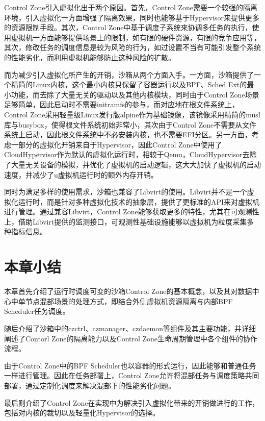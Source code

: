 Control Zone引入虚拟化出于两个原因。首先，Control Zone需要一个较强的隔离环境，引入虚拟化一方面增强了隔离效果，同时也能够基于Hypervisor来提供更多的资源限制手段。其次，Control Zone中基于调度子系统来协调多任务的执行，使用虚拟机一方面能够提供场景上的限制，如有限的硬件资源，有限的竞争应用等，其次，修改任务的调度信息是较为风险的行为，如过设置不当有可能引发整个系统的性能劣化，而利用虚拟机能够防止这种风险的扩散。

而为减少引入虚拟化所产生的开销，沙箱从两个方面入手。一方面，沙箱提供了一个精简的Linux内核，这个最小内核只保留了容器运行以及BPF、Sched Ext的最小功能，而去除了大量无关的驱动以及其他内核模块，同时由于Control Zone场景足够简单，因此启动时不需要initramfs的参与，而对应地在根文件系统上，Control Zone采用轻量级Linux发行版alpine作为基础镜像，该镜像采用精简的musl库与busybox，使得根文件系统初始非常小，其次由于Control Zone不需要从文件系统上启动，因此根文件系统中不必安装内核，也不需要EFI分区。另一方面，考虑一部分的虚拟化开销来自于Hypervisor，因此Control Zone中使用了CloudHypervisor作为默认的虚拟化运行时，相较于Qemu，CloudHypervisor去除了大量无关设备的模拟，并优化了虚拟机的启动逻辑，这大大加快了虚拟机的启动速度，并减少了u虚拟机运行时的额外内存开销。

同时为满足多样的使用需求，沙箱也兼容了Libvirt的使用。Libvirt并不是一个虚拟化运行时，而是针对多种虚拟化技术的抽象层，提供了更标准的API来对虚拟机进行管理。通过兼容Libvirt，Control Zone能够获取更多的特性，尤其在可观测性上，借助Libvirt提供的监测接口，可观测性基础设施能够以虚拟机为粒度采集多种指标信息。

\section{本章小结}

本章首先介绍了运行时调度可变的沙箱Control Zone的基本概念，以及其对数据中心中单节点混部场景的处理方式，即结合外侧虚拟机资源隔离与内部BPF Scheduler任务调度。

随后介绍了沙箱中的czctrl、czmanager、czdaemon等组件及其主要功能，并详细阐述了Contorl Zone的隔离能力以及Control Zone生命周期管理中各个组件的协作流程。

由于Control Zone中的BPF Scheduler也以容器的形式运行，因此能够和普通任务一样进行管理。因此在任务部署上，Control Zone允许将混部任务与调度策略共同部署，通过定制化调度来解决混部下的性能劣化问题。

最后则介绍了Control Zone在实现中为解决引入虚拟化带来的开销做进行的工作，包括对内核的裁切以及轻量化Hypervisor的选择。